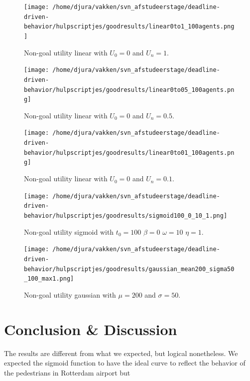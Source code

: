 \documentclass[11pt]{book}
\begin{document}
\begin{figure}
\centering
\texttt{[image: /home/djura/vakken/svn\_afstudeerstage/deadline-driven-behavior/hulpscriptjes/goodresults/linear0to1\_100agents.png]}
\caption{Non-goal utility linear with $U_0=0$ and $U_n=1$.}
\label{fig:linear0to1_100agents}
\end{figure}


\begin{figure}
\centering
\texttt{[image: /home/djura/vakken/svn\_afstudeerstage/deadline-driven-behavior/hulpscriptjes/goodresults/linear0to05\_100agents.png]}
\caption{Non-goal utility linear with $U_0 = 0$ and $U_n=0.5$.}
\label{fig:linear0to0.5_100agents}
\end{figure}

\begin{figure}
\centering
\texttt{[image: /home/djura/vakken/svn\_afstudeerstage/deadline-driven-behavior/hulpscriptjes/goodresults/linear0to01\_100agents.png]}
\caption{Non-goal utility linear with $U_0=0$ and $U_n=0.1$.}
\label{fig:linear0to01_100agents}
\end{figure}

\begin{figure}
\centering
\texttt{[image: /home/djura/vakken/svn\_afstudeerstage/deadline-driven-behavior/hulpscriptjes/goodresults/sigmoid100\_0\_10\_1.png]}
\caption{Non-goal utility sigmoid with $t_0=100$ $\beta=0$ $\omega=10$ $\eta=1$.}
\label{fig:sigmoid100_0_10_1}
\end{figure}

\begin{figure}
\centering
\texttt{[image: /home/djura/vakken/svn\_afstudeerstage/deadline-driven-behavior/hulpscriptjes/goodresults/gaussian\_mean200\_sigma50\_100\_max1.png]}
\caption{Non-goal utility gaussian with $\mu=200$ and $\sigma=50$.}
\label{fig:gaussian_mean200_sigma50_100_max1}
\end{figure}

\chapter{Conclusion \& Discussion}
\label{chap:conclusiondiscusssion}
The results are different from what we expected, but logical nonetheless. We expected the sigmoid function to have the ideal curve to reflect the behavior of the pedestrians in Rotterdam airport but
\end{document}
